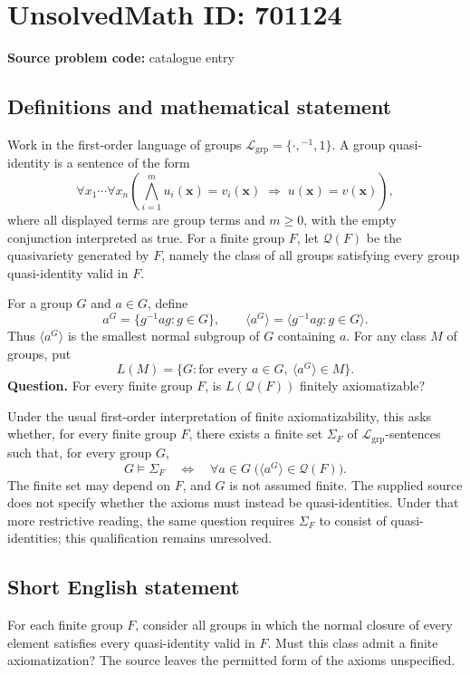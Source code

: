 \documentclass[11pt]{article}
\begin{document}
\section*{UnsolvedMath ID: 701124}
\textbf{Source problem code:} catalogue entry
\subsection{Definitions and mathematical statement}
Work in the first-order language of groups \(\mathcal L_{\mathrm{grp}}=\{\cdot,{}^{-1},1\}\). A group quasi-identity is a sentence of the form
\[
\forall x_1\cdots\forall x_n\left(\bigwedge_{i=1}^{m}u_i(\mathbf x)=v_i(\mathbf x)\;\Longrightarrow\;u(\mathbf x)=v(\mathbf x)\right),
\]
where all displayed terms are group terms and \(m\geq 0\), with the empty conjunction interpreted as true. For a finite group \(F\), let \(\mathcal Q(F)\) be the quasivariety generated by \(F\), namely the class of all groups satisfying every group quasi-identity valid in \(F\).

For a group \(G\) and \(a\in G\), define
\[
a^G=\{g^{-1}ag:g\in G\},\qquad
\langle a^G\rangle=\langle g^{-1}ag:g\in G\rangle.
\]
Thus \(\langle a^G\rangle\) is the smallest normal subgroup of \(G\) containing \(a\). For any class \(M\) of groups, put
\[
L(M)=\{G:\text{for every }a\in G,\ \langle a^G\rangle\in M\}.
\]
\textbf{Question.} For every finite group \(F\), is \(L(\mathcal Q(F))\) finitely axiomatizable?

Under the usual first-order interpretation of finite axiomatizability, this asks whether, for every finite group \(F\), there exists a finite set \(\Sigma_F\) of \(\mathcal L_{\mathrm{grp}}\)-sentences such that, for every group \(G\),
\[
G\models\Sigma_F
\quad\Longleftrightarrow\quad
\forall a\in G\;\bigl(\langle a^G\rangle\in\mathcal Q(F)\bigr).
\]
The finite set may depend on \(F\), and \(G\) is not assumed finite. The supplied source does not specify whether the axioms must instead be quasi-identities. Under that more restrictive reading, the same question requires \(\Sigma_F\) to consist of quasi-identities; this qualification remains unresolved.
\subsection{Short English statement}
For each finite group \(F\), consider all groups in which the normal closure of every element satisfies every quasi-identity valid in \(F\). Must this class admit a finite axiomatization? The source leaves the permitted form of the axioms unspecified.
\end{document}
